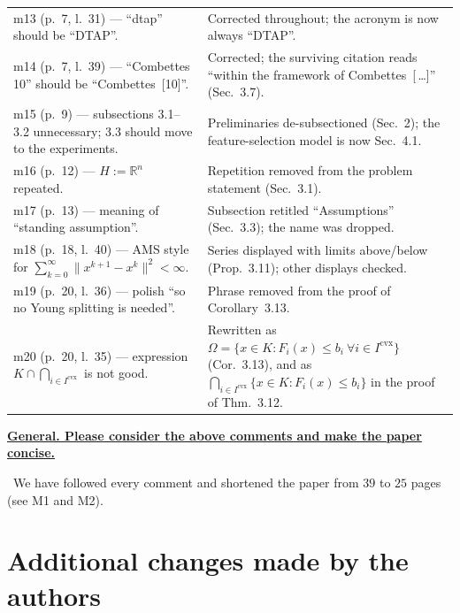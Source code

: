 \documentclass[11pt]{article}
\newcommand{\response}[1]{\smallskip\noindent{\color{blue!60!black}\textbf{Response.}}\ #1\par\medskip}
\newenvironment{point}[1]{\medskip\noindent\textbf{\uline{#1}}\par}{\par}
\begin{document}
{\begin{longtable}{@{}>{\raggedright\arraybackslash}p{}
                    >{\raggedright\arraybackslash}p{}@{}}
m13 (p.~7, l.~31) --- ``dtap'' should be ``DTAP''.
  & Corrected throughout; the acronym is now always ``DTAP''.\\
m14 (p.~7, l.~39) --- ``Combettes 10'' should be ``Combettes~[10]''.
  & Corrected; the surviving citation reads ``within the framework of Combettes~[\,\dots]'' (Sec.~3.7).\\
m15 (p.~9) --- subsections 3.1--3.2 unnecessary; 3.3 should move to the experiments.
  & Preliminaries de-subsectioned (Sec.~2); the feature-selection model is now Sec.~4.1.\\
m16 (p.~12) --- $H:=\mathbb{R}^n$ repeated.
  & Repetition removed from the problem statement (Sec.~3.1).\\
m17 (p.~13) --- meaning of ``standing assumption''.
  & Subsection retitled ``Assumptions'' (Sec.~3.3); the name was dropped.\\
m18 (p.~18, l.~40) --- AMS style for $\sum_{k=0}^{\infty}\lVert x^{k+1}-x^k\rVert^2<\infty$.
  & Series displayed with limits above/below (Prop.~3.11); other displays checked.\\
m19 (p.~20, l.~36) --- polish ``so no Young splitting is needed''.
  & Phrase removed from the proof of Corollary~3.13.\\
m20 (p.~20, l.~35) --- expression $K\cap\bigcap_{i\in I^{\mathrm{cvx}}}$ is not good.
  & Rewritten as $\Omega=\{x\in K:F_i(x)\le b_i\ \forall i\in I^{\mathrm{cvx}}\}$ (Cor.~3.13), and as $\bigcap_{i\in I^{\mathrm{cvx}}}\{x\in K:F_i(x)\le b_i\}$ in the proof of Thm.~3.12.\\
\end{longtable}}

\begin{point}{General. Please consider the above comments and make the paper concise.}
\response{We have followed every comment and shortened the paper from $39$ to $25$ pages
(see M1 and M2).}
\end{point}

\section*{Additional changes made by the authors}
\end{document}
